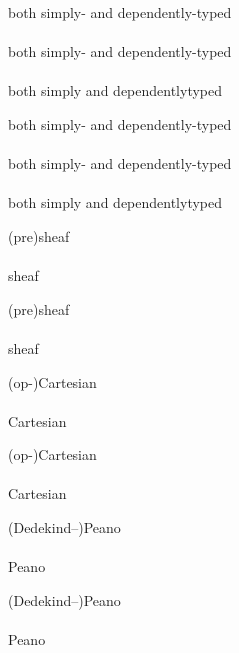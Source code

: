 \documentclass{article}
\begin{document}
\begin{verbatim*}
\begin{minipage}{0pt}
both simply- and dependently-typed\\\\
both simply\hyp{} and dependently\hyp{}typed\\\\
both simply\nbhyp{} and dependently\nbhyp{}typed\\
\end{minipage}
\end{verbatim*}
%
\begin{minipage}{0pt}
  both simply- and dependently-typed\\\\
  both simply\hyp{} and dependently\hyp{}typed\\\\
  both simply\nbhyp{} and dependently\nbhyp{}typed\\
\end{minipage}

\begin{verbatim*}
\begin{minipage}{0pt}
(pre)sheaf\\\\
sheaf\\
\end{minipage}
\end{verbatim*}
%
\begin{minipage}{0pt}
  (pre)sheaf\\\\
  sheaf\\
\end{minipage}

\begin{verbatim*}
\begin{minipage}{0pt}
(op-)Cartesian\\\\
Cartesian\\
\end{minipage}
\end{verbatim*}
%
\begin{minipage}{0pt}
  (op-)Cartesian\\\\
  Cartesian\\
\end{minipage}

\begin{verbatim*}
\begin{minipage}{0pt}
(Dedekind--)Peano\\\\
Peano\\
\end{minipage}
\end{verbatim*}
%
\begin{minipage}{0pt}
  (Dedekind--)Peano\\\\
  Peano\\
\end{minipage}
\end{document}
